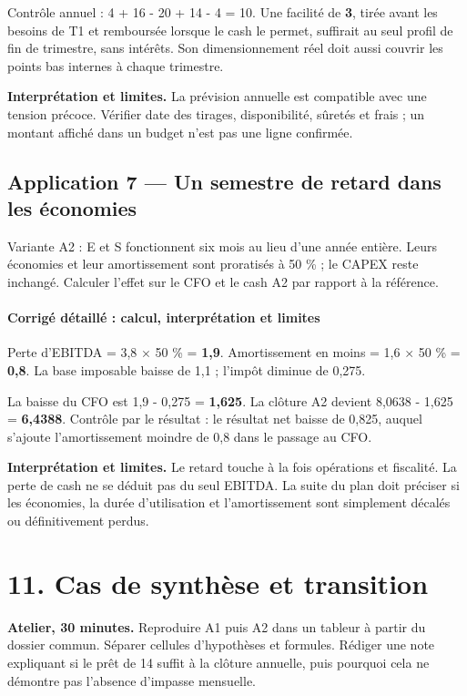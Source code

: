 \documentclass[12pt,a4paper]{article}
\begin{document}
Contrôle annuel : 4 + 16 - 20 + 14 - 4 = 10. Une facilité de \textbf{3}, tirée avant les besoins de T1 et remboursée lorsque le cash le permet, suffirait au seul profil de fin de trimestre, sans intérêts. Son dimensionnement réel doit aussi couvrir les points bas internes à chaque trimestre.

\textbf{Interprétation et limites.} La prévision annuelle est compatible avec une tension précoce. Vérifier date des tirages, disponibilité, sûretés et frais ; un montant affiché dans un budget n’est pas une ligne confirmée.


\subsection*{Application 7 --- Un semestre de retard dans les économies}
Variante A2 : E et S fonctionnent six mois au lieu d’une année entière. Leurs économies et leur amortissement sont proratisés à 50 \% ; le CAPEX reste inchangé. Calculer l’effet sur le CFO et le cash A2 par rapport à la référence.


\paragraph{Corrigé détaillé : calcul, interprétation et limites}
Perte d’EBITDA = 3,8 $\times$ 50 \% = \textbf{1,9}. Amortissement en moins = 1,6 $\times$ 50 \% = \textbf{0,8}. La base imposable baisse de 1,1 ; l’impôt diminue de 0,275.

La baisse du CFO est 1,9 - 0,275 = \textbf{1,625}. La clôture A2 devient 8,0638 - 1,625 = \textbf{6,4388}. Contrôle par le résultat : le résultat net baisse de 0,825, auquel s’ajoute l’amortissement moindre de 0,8 dans le passage au CFO.

\textbf{Interprétation et limites.} Le retard touche à la fois opérations et fiscalité. La perte de cash ne se déduit pas du seul EBITDA. La suite du plan doit préciser si les économies, la durée d’utilisation et l’amortissement sont simplement décalés ou définitivement perdus.

\section*{11. Cas de synthèse et transition}
\textbf{Atelier, 30 minutes.} Reproduire A1 puis A2 dans un tableur à partir du dossier commun. Séparer cellules d’hypothèses et formules. Rédiger une note expliquant si le prêt de 14 suffit à la clôture annuelle, puis pourquoi cela ne démontre pas l’absence d’impasse mensuelle.
\end{document}
